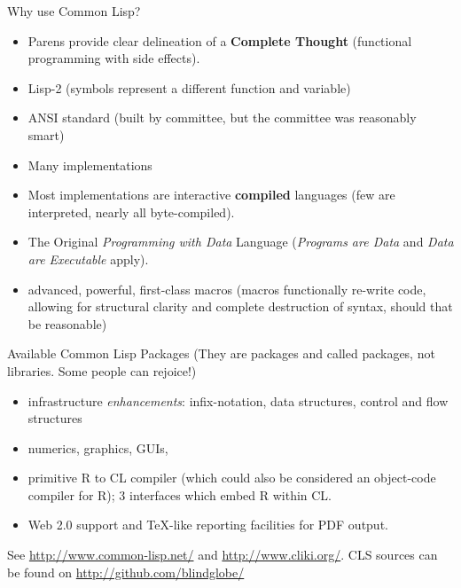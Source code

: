 \documentclass{beamer}
\begin{document}
\begin{frame}{Why use Common Lisp?}
  \begin{itemize}
  \item Parens provide clear delineation of a \textbf{Complete
      Thought} (functional programming with side effects).
  \item Lisp-2 (symbols represent a different function and variable)
  \item ANSI standard (built by committee, but the committee was
    reasonably smart)
  \item Many implementations
  \item Most implementations are interactive \textbf{compiled}
    languages (few are interpreted, nearly all  byte-compiled).
  \item The Original \emph{Programming with Data} Language
    (\emph{Programs are Data} and \emph{Data are Executable} apply).
  \item advanced, powerful, first-class macros (macros functionally
    re-write code, allowing for structural clarity and complete
    destruction of syntax, should that be reasonable)
  \end{itemize}
\end{frame}

\begin{frame}{Available Common Lisp Packages}
  (They are packages and called packages, not libraries.  Some people
  can rejoice!)
  \begin{itemize}
  \item infrastructure \emph{enhancements}: infix-notation, data
    structures, control and flow structures
  \item numerics, graphics, GUIs, 
  \item primitive R to CL compiler (which could also be considered an
    object-code compiler for R); 3 interfaces which embed R within CL.
  \item Web 2.0 support and TeX-like reporting facilities for PDF
    output.
  \end{itemize}
  See \url{http://www.common-lisp.net/} and
  \url{http://www.cliki.org/}.  CLS sources can be found on
  \url{http://github.com/blindglobe/}
\end{frame}
\end{document}
